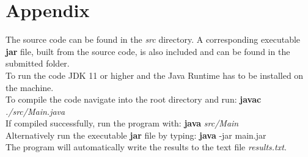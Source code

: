 \documentclass{article}
\begin{document}
\newpage
	

\appendix

\section{Appendix}
The source code can be found in the \textit{src} directory. A corresponding executable \textbf{jar} file, built from the source code, is also included and can be found in the submitted folder.\\
To run the code JDK 11 or higher and the Java Runtime has to be installed on the machine.\\

To compile the code navigate into the root directory and run: \textbf{javac} \textit{./src/Main.java}\\

If compiled successfully, run the program with: \textbf{java} \textit{src/Main}\\

Alternatively run the executable \textbf{jar} file by typing: \textbf{java} -jar main.jar\\

The program will automatically write the results to the text file \textit{results.txt}.
\end{document}
